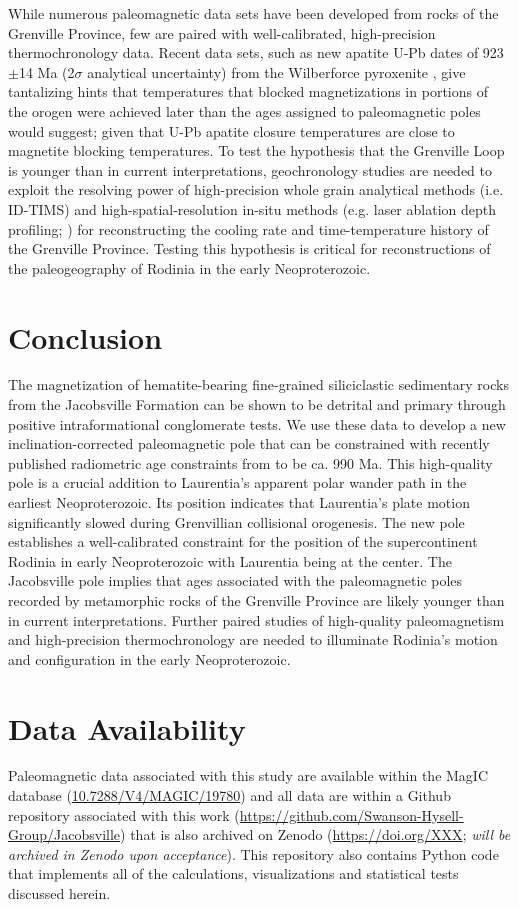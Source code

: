 \documentclass[draft]{agujournal2019}
\begin{document}
While numerous paleomagnetic data sets have been developed from rocks of the Grenville Province, few are paired with well-calibrated, high-precision thermochronology data. Recent data sets, such as new apatite U-Pb dates of 923$\pm$14 Ma (2$\sigma$ analytical uncertainty) from the Wilberforce pyroxenite \cite{Paul2021a}, give tantalizing hints that temperatures that blocked magnetizations in portions of the orogen were achieved later than the ages assigned to paleomagnetic poles would suggest; given that U-Pb apatite closure temperatures are close to magnetite blocking temperatures. To test the hypothesis that the Grenville Loop is younger than in current interpretations, geochronology studies are needed to exploit the resolving power of high-precision whole grain analytical methods (i.e. ID-TIMS) and high-spatial-resolution in-situ methods (e.g. laser ablation depth profiling; ) for reconstructing the cooling rate and time-temperature history of the Grenville Province. Testing this hypothesis is critical for reconstructions of the paleogeography of Rodinia in the early Neoproterozoic. 

\section*{Conclusion}

The magnetization of hematite-bearing fine-grained siliciclastic sedimentary rocks from the Jacobsville Formation can be shown to be detrital and primary through positive intraformational conglomerate tests. We use these data to develop a new inclination-corrected paleomagnetic pole that can be constrained with recently published radiometric age constraints from  to be ca. 990 Ma. This high-quality pole is a crucial addition to Laurentia's apparent polar wander path in the earliest Neoproterozoic. Its position indicates that Laurentia's plate motion significantly slowed during Grenvillian collisional orogenesis. The new pole establishes a well-calibrated constraint for the position of the supercontinent Rodinia in early Neoproterozoic with Laurentia being at the center. The Jacobsville pole implies that ages associated with the paleomagnetic poles recorded by metamorphic rocks of the Grenville Province are likely younger than in current interpretations. Further paired studies of high-quality paleomagnetism and high-precision thermochronology are needed to illuminate Rodinia's motion and configuration in the early Neoproterozoic. 

\section*{Data Availability}
Paleomagnetic data associated with this study are available within the MagIC database (\url{10.7288/V4/MAGIC/19780}) and all data are within a Github repository associated with this work (\url{https://github.com/Swanson-Hysell-Group/Jacobsville}) that is also archived on Zenodo (\url{https://doi.org/XXX}; \textit{will be archived in Zenodo upon acceptance}). This repository also contains Python code that implements all of the calculations, visualizations and statistical tests discussed herein. 
\end{document}
